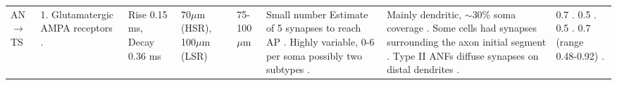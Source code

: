 \begin{longtable}{XXXXXXXX}
AN\ensuremath{\rightarrow}TS                       
& %
1. Glutamatergic AMPA receptors \citep{FerragamoGoldingEtAl:1998a,WentholdHunterEtAl:1993}. 
& %
Rise 0.15 ms,  Decay 0.36 ms \citep[Mouse, Slice prep.\ 34 C degrees]{GardnerTrussellEtAl:2001,Gardner:2000,GardnerTrussellEtAl:1999}
& %
70$\mu$m (HSR), 100$\mu$m (LSR)  \citep[Single fibres][]{OertelWuEtAl:1990,Ryugo:2008,MeltzerRyugo:2006,RyugoParks:2003,Ryugo:1992,BrownBerglundEtAl:1988,RoullierCronin-SchreiberEtAl:1986,FeketeRouillerEtAl:1984} 
& %
75-100$\mu$m \citep[Mouse]{OertelWuEtAl:1990} 
& %
Small number \citep{Cant:1981,FayPopper:1994,ReddCahillEtAl:2002,RyugoWrigthEtAl:1993,Ryugo:1992,RyugoParks:2003}
Estimate of 5 synapses to reach AP \citep[Mouse][]{FerragamoGoldingEtAl:1998a}. 
Highly variable, 0-6 per soma possibly two subtypes \citep[Chinchilla][]{JosephsonMorest:1998}.
& %
Mainly dendritic, $\sim$30\% soma coverage \citep[Cat][]{Cant:1981,Cant:1982,RyugoWrightEtAl:1993,TolbertMorest:1982a}. 
\citep[cat][Soma: 36$\pm$10.5 \%  of 21 (range 6-38) \% area coverage, Prox: 43$\pm$29 \%  of 46 \% area cov., Distal: 40$\pm$12 \%  of 22 \% area cov.]{SmithRhode:1989}
Some cells had synapses surrounding the axon initial segment \citep{JosephsonMorest:1998}. 
Type II ANFs diffuse synapses on distal dendrites \citep{BensonBrown:2004}.
& %
0.7  \citep[Mouse, slice prep., AN shock][]{Oertel:1983}. 
0.5  \citep[theoretical][]{Brown:1993,BrownLedwith:1990}.
0.5  \citep[Chinchilla][]{WickesbergOertel:1993}. 
0.7 (range 0.48-0.92) \citep[Mouse, slice prep., AN shock][]{FerragamoGoldingEtAl:1998a}. 

\end{longtable}
